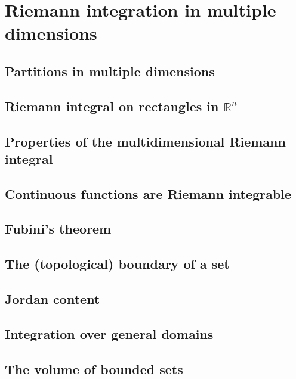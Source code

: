 \section{Riemann integration in multiple dimensions}

\subsection{Partitions in multiple dimensions}

\subsection{Riemann integral on rectangles in \texorpdfstring{$\mathbb{R}^n$}{Rn}}

\subsection{Properties of the multidimensional Riemann integral}

\subsection{Continuous functions are Riemann integrable}

\subsection{Fubini's theorem}

\subsection{The (topological) boundary of a set}

\subsection{Jordan content}

\subsection{Integration over general domains}

\subsection{The volume of bounded sets}
